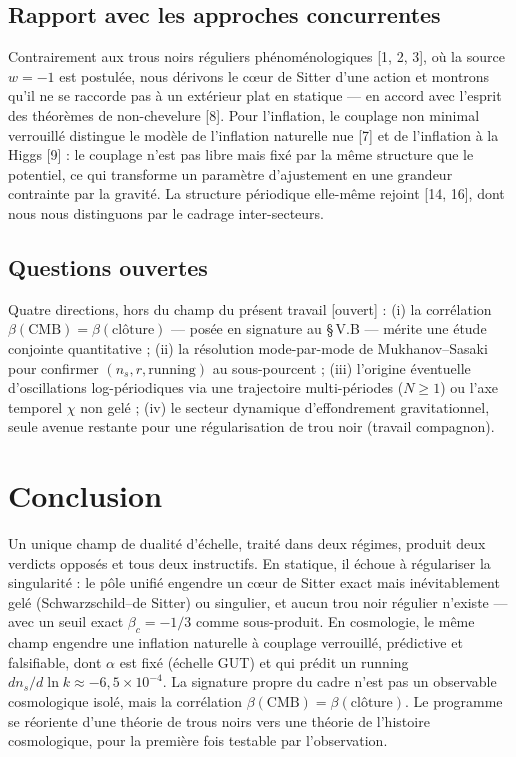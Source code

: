 \documentclass[11pt,a4paper]{article}
\newcommand{\statut}[1]{{\footnotesize\textsf{[#1]}}}
\theoremstyle{plain}
\theoremstyle{remark}
\begin{document}
\subsection{Rapport avec les approches concurrentes}
Contrairement aux trous noirs r\'eguliers ph\'enom\'enologiques [1, 2, 3], o\`u la source
$w=-1$ est postul\'ee, nous d\'erivons le c\oe ur de Sitter d'une action et montrons qu'il ne
se raccorde pas \`a un ext\'erieur plat en statique --- en accord avec l'esprit des
th\'eor\`emes de non-chevelure [8]. Pour l'inflation, le couplage non minimal verrouill\'e
distingue le mod\`ele de l'inflation naturelle nue [7] et de l'inflation \`a la Higgs [9] :
le couplage n'est pas libre mais fix\'e par la m\^eme structure que le potentiel, ce qui
transforme un param\`etre d'ajustement en une grandeur contrainte par la gravit\'e. La
structure p\'eriodique elle-m\^eme rejoint [14, 16], dont nous nous distinguons par le
cadrage inter-secteurs.

\subsection{Questions ouvertes}
Quatre directions, hors du champ du pr\'esent travail \statut{ouvert} : (i) la corr\'elation
$\beta(\mathrm{CMB})=\beta(\text{cl\^oture})$ --- pos\'ee en signature au \S\,V.B ---
m\'erite une \'etude conjointe quantitative ; (ii) la r\'esolution mode-par-mode de
Mukhanov--Sasaki pour confirmer $(n_s,r,\text{running})$ au sous-pourcent ; (iii)
l'origine \'eventuelle d'oscillations log-p\'eriodiques via une trajectoire multi-p\'eriodes
($N\ge1$) ou l'axe temporel $\chi$ non gel\'e ; (iv) le secteur dynamique d'effondrement
gravitationnel, seule avenue restante pour une r\'egularisation de trou noir (travail
compagnon).

\section{Conclusion}
Un unique champ de dualit\'e d'\'echelle, trait\'e dans deux r\'egimes, produit deux verdicts
oppos\'es et tous deux instructifs. En statique, il \'echoue \`a r\'egulariser la singularit\'e :
le p\^ole unifi\'e engendre un c\oe ur de Sitter exact mais in\'evitablement gel\'e
(Schwarzschild--de Sitter) ou singulier, et aucun trou noir r\'egulier n'existe --- avec un
seuil exact $\beta_c=-1/3$ comme sous-produit. En cosmologie, le m\^eme champ engendre une
inflation naturelle \`a couplage verrouill\'e, pr\'edictive et falsifiable, dont $\alpha$ est
fix\'e (\'echelle GUT) et qui pr\'edit un running $dn_s/d\ln k\approx-6{,}5\times10^{-4}$. La
signature propre du cadre n'est pas un observable cosmologique isol\'e, mais la corr\'elation
$\beta(\mathrm{CMB})=\beta(\text{cl\^oture})$. Le programme se r\'eoriente d'une th\'eorie de
trous noirs vers une th\'eorie de l'histoire cosmologique, pour la premi\`ere fois testable
par l'observation.
\end{document}
